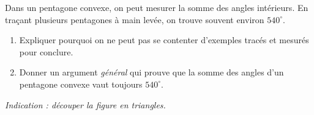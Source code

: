 Dans un pentagone convexe, on peut mesurer la somme des angles intérieurs.
En traçant plusieurs pentagones à main levée, on trouve souvent environ
$540^\circ$.
\begin{enumerate}
  \item Expliquer pourquoi on ne peut pas se contenter d'exemples tracés et
  mesurés pour conclure.
  \item Donner un argument \emph{général} qui prouve que la somme des angles
  d'un pentagone convexe vaut toujours $540^\circ$.
\end{enumerate}
\emph{Indication : découper la figure en triangles.}
